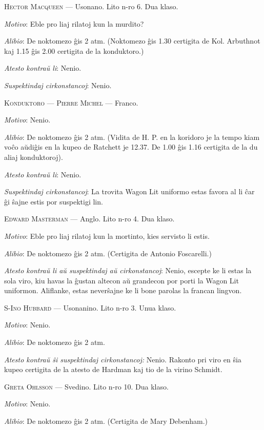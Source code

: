 \begin{addmargin}[1em]{2em}

\textsc{Hector Macqueen }--- Usonano. Lito n-ro 6. Dua klaso.

\emph{Motivo}: Eble pro liaj rilatoj kun la murdito?

\emph{Alibio}: De noktomezo ĝis 2 atm. (Noktomezo ĝis 1.30 certigita de Kol. Arbuthnot kaj 1.15 ĝis 2.00 certigita de la konduktoro.)

\emph{Atesto kontraŭ li}: Nenio.

\emph{Suspektindaj cirkonstancoj}: Nenio.

\noindent \textsc{Konduktoro --- Pierre Michel} --- Franco.

\emph{Motivo}: Nenio.

\emph{Alibio}: De noktomezo ĝis 2 atm. (Vidita de H. P. en la koridoro je la tempo kiam voĉo aŭdiĝis en la kupeo de Ratchett je 12.37. De 1.00 ĝis 1.16 certigita de la du aliaj konduktoroj).

\emph{Atesto kontraŭ li}: Nenio.

\emph{Suspektindaj cirkonstancoj}: La trovita Wagon Lit uniformo estas favora al li ĉar ĝi ŝajne estis por suspektigi lin.

\noindent \textsc{Edward Masterman} --- Anglo. Lito n-ro 4. Dua klaso.

\emph{Motivo}: Eble pro liaj rilatoj kun la mortinto, kies servisto li estis.

\emph{Alibio}: De noktomezo ĝis 2 atm. (Certigita de Antonio Foscarelli.)

\emph{Atesto kontraŭ li aŭ suspektindaj aŭ cirkonstancoj}: Nenio, escepte ke li estas la sola viro, kiu havas la ĝustan altecon aŭ grandecon por porti la Wagon Lit uniformon. Aliflanke, estas neverŝajne ke li bone parolas la francan lingvon.

\noindent \textsc{S-Ino Hubbard} --- Usonanino. Lito n-ro 3. Unua klaso.

\emph{Motivo}: Nenio.

\emph{Alibio}: De noktomezo ĝis 2 atm.

\emph{Atesto kontraŭ ŝi suspektindaj cirkonstancoj:} Nenio. Rakonto pri viro en ŝia kupeo certigita de la atesto de Hardman kaj tio de la virino Schmidt.

\noindent \textsc{Greta Ohlsson} --- Svedino. Lito n-ro 10. Dua klaso.

\emph{Motivo}: Nenio.

\emph{Alibio}: De noktomezo ĝis 2 atm. (Certigita de Mary Debenham.)


\end{addmargin}
